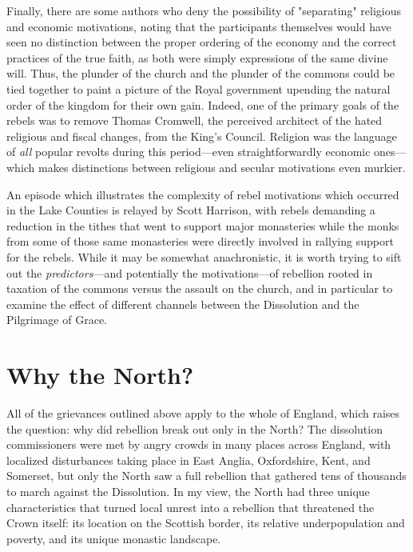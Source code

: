 \documentclass[12pt]{article}
\begin{document}
Finally, there are some authors who deny the possibility of "separating" religious and economic motivations, noting that the participants themselves would have seen no distinction between the proper ordering of the economy and the correct practices of the true faith, as both were simply expressions of the same divine will.\autocite[14]{Fletcher2008} Thus, the plunder of the church and the plunder of the commons could be tied together to paint a picture of the Royal government upending the natural order of the kingdom for their own gain. Indeed, one of the primary goals of the rebels was to remove Thomas Cromwell, the perceived architect of the hated religious and fiscal changes, from the King's Council.\autocite[308, 312]{Bush1991a} Religion was the language of \emph{all} popular revolts during this period---even straightforwardly economic ones---which makes distinctions between religious and secular motivations even murkier.\autocite[80]{Wood2002}

An episode which illustrates the complexity of rebel motivations which occurred in the Lake Counties is relayed by Scott Harrison, with rebels demanding a reduction in the tithes that went to support major monasteries\autocite[59-60]{Harrison1981} while the monks from some of those same monasteries were directly involved in rallying support for the rebels.\autocite[73]{Harrison1981} While it may be somewhat anachronistic, it is worth trying to sift out the \emph{predictors}---and potentially the motivations---of rebellion rooted in taxation of the commons versus the assault on the church, and in particular to examine the effect of different channels between the Dissolution and the Pilgrimage of Grace.

\section{Why the North?}
All of the grievances outlined above apply to the whole of England, which raises the question: why did rebellion break out only in the North? The dissolution commissioners were met by angry crowds in many places across England, with localized disturbances taking place in East Anglia, Oxfordshire, Kent, and Somerset, but only the North saw a full rebellion that gathered tens of thousands to march against the Dissolution.  In my view, the North had three unique characteristics that turned local unrest into a rebellion that threatened the Crown itself: its location on the Scottish border, its relative underpopulation and poverty, and its unique monastic landscape. 
\end{document}
